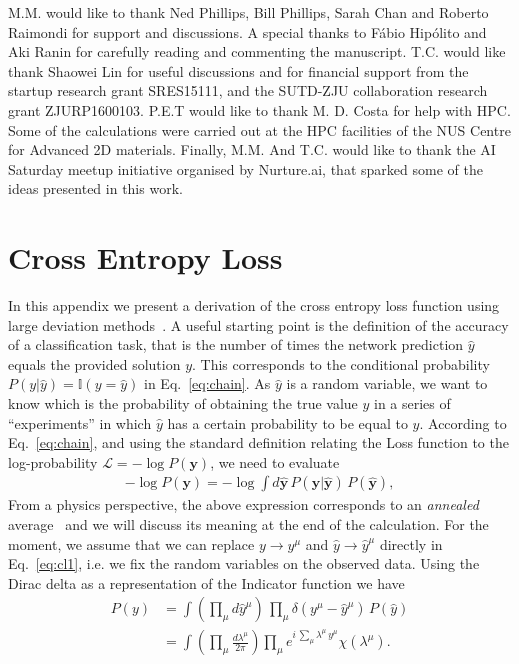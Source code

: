 \documentclass{article}
\begin{document}
M.M. would like to thank Ned Phillips, Bill Phillips, Sarah Chan and Roberto Raimondi for support and discussions. A special thanks to  F\'abio Hip\'olito and Aki Ranin for carefully reading and commenting the manuscript. T.C. would like thank Shaowei Lin for useful discussions and for financial support from the startup research grant
SRES15111, and the SUTD-ZJU collaboration research\\
grant ZJURP1600103. P.E.T would like to thank M. D. Costa for help with HPC. Some of the calculations were carried out at the HPC facilities of the NUS Centre for Advanced 2D materials. Finally, M.M. And T.C. would like to thank the AI Saturday meetup initiative organised by Nurture.ai, that sparked some of the ideas presented in this work.

\appendix
\section{Cross Entropy Loss} \label{a:loss}
%
In this appendix we present a derivation of the cross entropy loss function using large deviation methods~\cite{mezard}. A useful starting point is the definition of the accuracy of a classification task, that is the number of times the network prediction $\hat{y}$ equals the provided solution $y$. This corresponds to the conditional probability $P(y|\hat{y}) =  \mathbb{I}(y = \hat{y})$ in Eq.~\eqref{eq:chain}.  As $\hat{y}$ is a random variable, we want to know which is the probability of obtaining the true value $y$ in a series of ``experiments'' in which $\hat{y}$  has a certain probability to be equal to $y$. According to Eq.~\eqref{eq:chain}, and using the standard definition  relating the Loss function to the log-probability $\mathscr{L} = - \log P(\mathbf{y})$, we need to evaluate
%
 \begin{align} \label{eq:cl1}
-\log P(\mathbf{y}) = - \log \int d \hat{\mathbf{y}}\, P(\mathbf{y} | \hat{\mathbf{y}}) \, P(\hat{\mathbf{y}}),
 \end{align}
%
From a physics perspective, the above expression corresponds to an {\it annealed } average~\cite{parisi2, giardina} and we will discuss its meaning at the end of the calculation. For the moment, we assume that we can replace $y \to y^{\mu}$ and $\hat{y} \to \hat{y}^{\mu}$ directly in Eq.~\eqref{eq:cl1}, i.e. we fix the random variables on the observed data. Using the Dirac delta  as a representation of the Indicator function we have
%
 \begin{align} \label{eq:cl1}
 P(y) & =  \int  \left( \prod_{\mu} d \hat{y}^{\mu} \right)  \,  \prod_{\mu} \delta( y^{\mu} - \hat{y}^{\mu})  \, P(\hat{y})\\ \nonumber
 &=  \int  \left( \prod_{\mu}  \frac{d\lambda^{\mu}}{2\pi} \right) \prod_{\mu}  e^{i \, \sum_{\mu} \lambda^{\mu} \, y^{\mu} } \chi(\lambda^{\mu}).
  \end{align}
\end{document}
